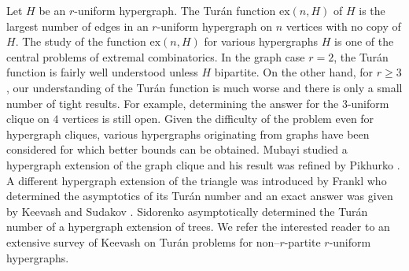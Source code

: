 \documentclass[a4paper,11pt]{article}
\theoremstyle{definition}
\def\ex{\mathrm{ex}}
\begin{document}
Let $H$ be an $r$-uniform hypergraph. The Tur\'an function $\ex(n,H)$ of $H$ is the largest number of edges in an $r$-uniform hypergraph on $n$ vertices with no copy of $H$. The study of the function $\ex(n,H)$ for various hypergraphs $H$ is one of the central problems of extremal combinatorics. In the graph case $r=2$, the Tur\'an function is fairly well understood unless $H$ bipartite. On the other hand, for $r \ge 3$, our understanding of the Tur\'an function is much worse and there is only a small number of tight results. For example, determining the answer for the $3$-uniform clique on $4$ vertices is still open. Given the difficulty of the problem even for hypergraph cliques, various hypergraphs originating from graphs have been considered for which better bounds can be obtained. Mubayi \cite{mubayi2006hypergraph} studied a hypergraph extension of the graph clique and his result was refined by Pikhurko \cite{Pikh05}. A different hypergraph extension of the triangle was introduced by Frankl \cite{Frankl1990AsymptoticSO} who determined the asymptotics of its Tur\'an number and an exact answer was given by Keevash and Sudakov \cite{KS05}. Sidorenko \cite{Sidorenko89} asymptotically determined the Tur\'an number of a hypergraph extension of trees. We refer the interested reader to an extensive survey of Keevash \cite{keevash_2011} on Tur\'{a}n problems for non--$r$-partite $r$-uniform hypergraphs.
\end{document}
